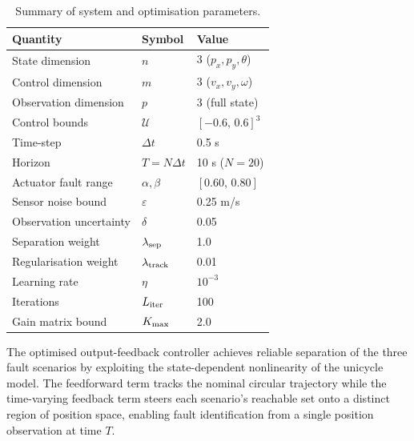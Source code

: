 \documentclass[11pt]{article}
\begin{document}
\begin{table}[ht]
\centering
\caption{Summary of system and optimisation parameters.}
\label{tab:summary}
\begin{tabular}{@{}lll@{}}
\toprule
\textbf{Quantity} & \textbf{Symbol} & \textbf{Value} \\
\midrule
State dimension         & $n$               & 3 ($p_x, p_y, \theta$) \\
Control dimension       & $m$               & 3 ($v_x, v_y, \omega$) \\
Observation dimension   & $p$               & 3 (full state) \\
Control bounds          & $\mathcal{U}$     & $[-0.6,\,0.6]^3$ \\
Time-step               & $\Delta t$        & 0.5 s \\
Horizon                 & $T = N\Delta t$   & 10 s ($N=20$) \\
Actuator fault range    & $\alpha,\beta$    & $[0.60,\,0.80]$ \\
Sensor noise bound      & $\varepsilon$     & 0.25 m/s \\
Observation uncertainty & $\delta$          & 0.05 \\
Separation weight       & $\lambda_{\rm sep}$   & 1.0 \\
Regularisation weight   & $\lambda_{\rm track}$ & 0.01 \\
Learning rate           & $\eta$            & $10^{-3}$ \\
Iterations              & $L_{\rm iter}$    & 100 \\
Gain matrix bound       & $K_{\rm max}$     & 2.0 \\
\bottomrule
\end{tabular}
\end{table}

The optimised output-feedback controller achieves reliable separation of the
three fault scenarios by exploiting the state-dependent nonlinearity of the
unicycle model. The feedforward term tracks the nominal circular trajectory
while the time-varying feedback term steers each scenario's reachable set onto
a distinct region of position space, enabling fault identification from a
single position observation at time $T$.
\end{document}
